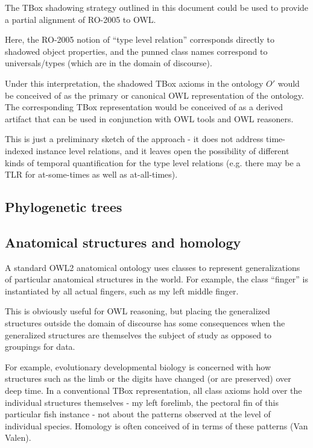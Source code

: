 \documentclass{my}
\begin{document}
The TBox shadowing strategy outlined in this document could be used to
provide a partial alignment of RO-2005 to OWL.

Here, the RO-2005 notion of ``type level relation'' corresponds
directly to shadowed object properties, and the punned class names
correspond to universals/types (which are in the domain of
discourse).

Under this interpretation, the shadowed TBox axioms in the ontology
$O'$ would be conceived of as the primary or canonical OWL
representation of the ontology. The corresponding TBox representation
would be conceived of as a derived artifact that can be used in
conjunction with OWL tools and OWL reasoners.

This is just a preliminary sketch of the approach - it does not
address time-indexed instance level relations, and it leaves open the
possibility of different kinds of temporal quantification for the type
level relations (e.g. there may be a TLR for at-some-times as well as
at-all-times).

\subsection{Phylogenetic trees}

\subsection{Anatomical structures and homology}

A standard OWL2 anatomical ontology uses classes to represent
generalizations of particular anatomical structures in the world. For
example, the class ``finger'' is instantiated by all actual fingers,
such as my left middle finger.

This is obviously useful for OWL reasoning, but placing the
generalized structures outside the domain of discourse has some
consequences when the generalized structures are themselves the
subject of study as opposed to groupings for data.

For example, evolutionary developmental biology is concerned with how
structures such as the limb or the digits have changed (or are
preserved) over deep time. In a conventional TBox representation, all
class axioms hold over the individual structures themselves - my left
forelimb, the pectoral fin of this particular fish instance - not
about the patterns observed at the level of individual
species. Homology is often conceived of in terms of these patterns
(Van Valen).
\end{document}
